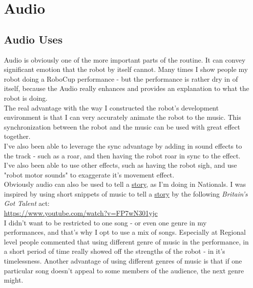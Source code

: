 	\chapter{Audio}
    	\section{Audio Uses}
          Audio is obviously one of the more important parts of the routine. It can convey significant emotion that the robot by itself cannot. Many times I show people my robot doing a RoboCup performance - but the performance is rather dry in of itself, because the Audio really enhances and provides an explanation to what the robot is doing.\\
        
          The real advantage with the way I constructed the robot's development environment is that I can very accurately animate the robot to the music. This synchronization between the robot and the music can be used with great effect together.\\
          
          I've also been able to leverage the sync advantage by adding in sound effects to the track - such as a roar, and then having the robot roar in sync to the effect. I've also been able to use other effects, such as having the robot sigh, and use "robot motor sounds" to exaggerate it's movement effect.\\
          
          Obviously audio can also be used to tell a \hyperref[Story]{story}, as I'm doing in Nationals. I was inspired by using short snippets of music to tell a \hyperref[Story]{story} by the following \textit{Britain's Got Talent} act:\\
          
          \url{https://www.youtube.com/watch?v=FP7wN301yjc}\\
          
			I didn't want to be restricted to one song - or even one genre in my performances, and that's why I opt to use a mix of songs. Especially at Regional level people commented that using different genre of music in the performance, in a short period of time really showed off the strengths of the robot - in it's timelessness. Another advantage of using different genres of music is that if one particular song doesn't appeal to some members of the audience, the next genre might.\\
            
